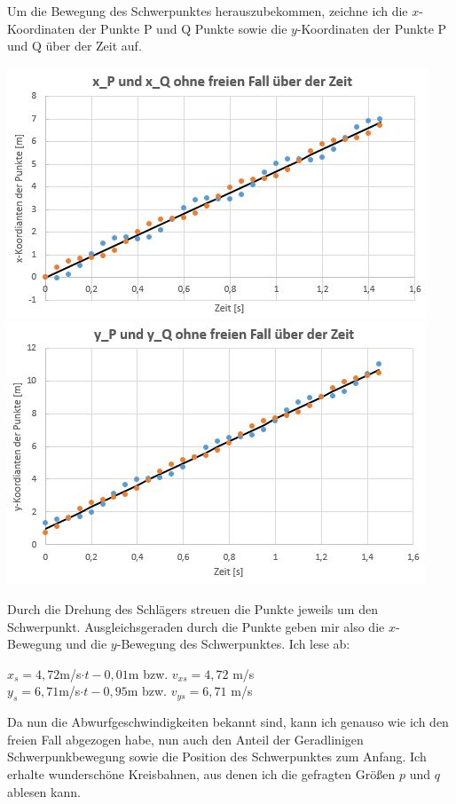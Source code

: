 \documentclass{article}
\begin{document}
Um die Bewegung des Schwerpunktes herauszubekommen, zeichne ich die $x$-Koordinaten der Punkte P und Q Punkte sowie die $y$-Koordinaten der Punkte P und Q über der Zeit auf. 
\begin{center}
	\includegraphics[scale=0.47]{x_s-ueber-Zeit.JPG}
	\includegraphics[scale=0.45]{y_s-ueber-Zeit.JPG}
\end{center}
Durch die Drehung des Schlägers streuen die Punkte jeweils um den Schwerpunkt. Ausgleichsgeraden durch die Punkte geben mir also die $x$-Bewegung und die $y$-Bewegung des Schwerpunktes.
Ich lese ab:
\begin{center}
	$x_s=4,72$m/s$\cdot t -0,01$m bzw. $ v_{xs} = 4,72$ m/s \\
	$y_s=6,71$m/s$\cdot t -0,95$m bzw. $ v_{ys} = 6,71$ m/s \\
\end{center}
Da nun die Abwurfgeschwindigkeiten bekannt sind, kann ich genauso wie ich den freien Fall abgezogen habe, nun auch den Anteil der Geradlinigen Schwerpunkbewegung sowie die Position des Schwerpunktes zum Anfang.
Ich erhalte wunderschöne Kreisbahnen, aus denen ich die gefragten Größen $p$ und $q$ ablesen kann. 
\end{document}
